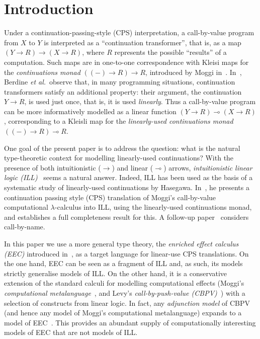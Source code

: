 \documentclass{LMCS}
\newcommand{\lpop}{\multimap}
\begin{document}
\maketitle

\section{Introduction}


Under a continuation-passing-style (CPS) interpretation, 
a call-by-value program
from $X$ to $Y$ is interpreted as a ``continuation transformer'',
that is, as a map $(Y \!\to\! R) \to (X \!\to \!R)$,  where $R$ represents the 
possible ``results'' of a computation.
Such maps are in one-to-one correspondence with Kleisi maps
for the \emph{continuations monad} $((-) \to R) \to R$, introduced by 
Moggi in~\cite{Moggi:89,Moggi:91}. 
In~\cite{BORT:02}, Berdine \emph{et al.}\ observe that,
in many programming situations, continuation transformers satisfy an
additional property: 
their argument, the continuation $Y \to R$, is used just once,
that is, it is used \emph{linearly}.
Thus a call-by-value program can be more informatively modelled as a
linear function $(Y \to R) \lpop (X \to R)$, corresponding to a
Kleisli map for the \emph{linearly-used continuations monad} 
$((-) \to R) \lpop R$.  

One goal of the present paper is to address the question: 
what is the natural type-theoretic context for
modelling linearly-used continuations? 
With the presence of both intuitionistic ($\to$) and linear ($\lpop$)
arrows, \emph{intuitionistic linear logic (ILL)}~\cite{Girard:87}
seems a natural answer.
Indeed, ILL has been used as the basis of a systematic study of 
linearly-used continuations by Hasegawa. 
In~\cite{Hasegawa:Flops:02}, he presents a
continuation passing style (CPS) translation of 
Moggi's call-by-value computational $\lambda$-calculus into
ILL, using the linearly-used continuations monad, and establishes
a full completeness result for this. 
A follow-up paper~\cite{Hasegawa:Flops:04} considers call-by-name.

In this paper we use a more general type theory, the \emph{enriched
  effect calculus (EEC)} introduced in~\cite{EMS,EMSb}, as a target
language for linear-use CPS translations.  On the one hand, EEC can be
seen as a fragment of ILL and, as such, its models strictly generalise
models of ILL.
On the other hand, it is a conservative extension of the standard
calculi for modelling computational effects (Moggi's
\emph{computational metalanguage}~\cite{Moggi:91}, 
and Levy's \emph{call-by-push-value (CBPV)}~\cite{Levy:book}) with a
selection of constructs from linear logic. 
In fact, any \emph{adjunction model} of CBPV~\cite{Levy:models}
(and hence any model of Moggi's computational metalanguage)
expands to a model of EEC~\cite{EMS,EMSc}. This provides an abundant supply of 
computationally interesting models of EEC
that are not models of ILL.
\end{document}
